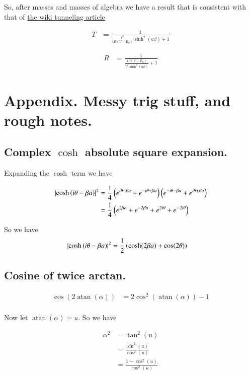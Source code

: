\documentclass{article}
\DeclareMathOperator{\atan}{atan}
\begin{document}
So, after masses and masses of algebra we have a result that is consistent with that of
\href{http://en.wikipedia.org/wiki/Potential_barrier}{the wiki tunneling article}

\begin{align}
T 
&= \frac{1} { \frac{V^2}{4E(V-E_0)} \sinh^2(a \beta) + 1 }
\end{align}

\begin{align}
R 
&= \frac{1} { \frac{4V(V-E_0)}{V^2 \sinh^2(a \beta)} + 1 }
\end{align}

\section{ Appendix.  Messy trig stuff, and rough notes. }

\subsection{ Complex $\cosh$ absolute square expansion. }

Expanding the $\cosh$ term we have

\begin{align*}
\left\lvert{\cosh\left( i\theta -\beta a \right)}\right\rvert^2
&=
\frac{1}{4}
\left(
e^{i\theta - \beta a}
+ e^{-i\theta + \beta a}
\right)
\left(
e^{-i\theta - \beta a}
+ e^{i\theta + \beta a}
\right) \\
&=
\frac{1}{4}\left(
e^{2\beta a}
+ e^{-2\beta a}
+e^{2i\theta }
+e^{-2i\theta }
\right) \\
\end{align*}

So we have
\begin{align}\label{eqn:coshSquared}
\left\lvert{\cosh\left( i\theta -\beta a \right)}\right\rvert^2
&=\frac{1}{2}
\left( \cosh(2\beta a) + \cos(2\theta) \right)
\end{align}

\subsection{ Cosine of twice arctan. }

\begin{align*}
\cos(2\atan(\alpha)) 
&= 
2 \cos^2\left( \atan(\alpha) \right) -1 \\
\end{align*}

Now let $\atan(\alpha) = u$.  So we have

\begin{align*}
\alpha^2 
&=
\tan^2(u)  \\
&=
\frac{\sin^2(u)}{\cos^2(u)} \\
&=
\frac{1 -\cos^2(u)}{\cos^2(u)} \\
\end{align*}
\end{document}
